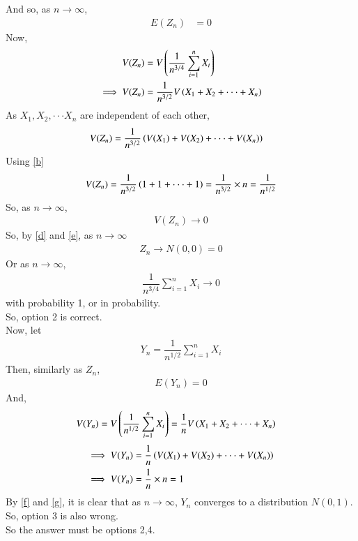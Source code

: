 \documentclass[journal,12pt,twocolumn]{IEEEtran}
\begin{document}
And so, as $n \to \infty$,
\begin{align} \label{d}
    E(Z_n) &=0
\end{align}
Now,
\begin{align}
    V(Z_n) &= V\left(\dfrac{1}{n^{3/4}}\sum_{i=1}^nX_i\right) \\
    \implies V(Z_n) &= \dfrac{1}{n^{3/2}}V\left(X_1+X_2+ \cdot \cdot \cdot +X_n\right)
\end{align}
As $X_1, X_2, \cdot \cdot \cdot X_n$ are independent of each other,
\begin{align}
    V(Z_n) &= \dfrac{1}{n^{3/2}}\left(V(X_1)+V(X_2)+ \cdot \cdot \cdot +V(X_n)\right)
\end{align}
Using \eqref{b}
\begin{align}
    V(Z_n)=\dfrac{1}{n^{3/2}}\left(1+1+\cdot \cdot \cdot+1\right)=\dfrac{1}{n^{3/2}}\times n=\dfrac{1}{n^{1/2}}
\end{align}
So, as $n \to \infty$,
\begin{align} \label{e}
    V(Z_n) \to 0
\end{align}
So, by \eqref{d} and \eqref{e}, as $n \to \infty$
\begin{align}
    Z_n \to N(0,0)=0
\end{align}
Or as $n \to \infty$,
\begin{align}
    \dfrac{1}{n^{3/4}}\sum_{i=1}^nX_i \to 0
\end{align}
with probability 1, or in probability.\\
So, option 2 is correct.\vspace{0.3cm}\\
Now, let
\begin{align}
    Y_n=\dfrac{1}{n^{1/2}}\sum_{i=1}^nX_i
\end{align}
Then, similarly as $Z_n$,
\begin{align} \label{f}
    E(Y_n)=0
\end{align}
And,
\begin{align}
    V(Y_n)&=V\left(\dfrac{1}{n^{1/2}}\sum_{i=1}^nX_i\right)=\dfrac{1}{n}V\left(X_1+X_2+ \cdot \cdot \cdot +X_n\right)
\end{align}
\begin{align}
    \implies V(Y_n)&=\dfrac{1}{n}\left(V(X_1)+V(X_2)+ \cdot \cdot \cdot +V(X_n)\right) \\
    \label{g}
    \implies V(Y_n)&=\dfrac{1}
    {n}\times n=1
\end{align}
By \eqref{f} and \eqref{g}, it is clear that as $n \to \infty$, $Y_n$ converges to a distribution $N(0,1)$.\\
So, option 3 is also wrong.
\vspace{0.3cm}\\
So the answer must be options 2,4.
\end{document}
